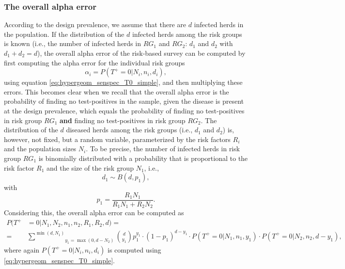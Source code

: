 \documentclass[nojss]{jss}
\begin{document}

\subsubsection{The overall alpha error}

According to the design prevalence, we assume that there are $d$ infected herds in the population. If the distribution of the $d$ infected herds among the risk groups is known (i.e., the number of infected herds in $RG_1$ and $RG_2$: $d_1$ and $d_2$ with $d_1 + d_2 = d$), the overall alpha error of the risk-based survey can be computed by first computing the alpha error for the individual risk groups
$$
\alpha_i = P(T^+=0 | N_i, n_i, d_i),
$$
using equation \eqref{eq:hypergeom_senspec_T0_simple}, and then multiplying these errors. This becomes clear when we recall that the overall alpha error is the probability of finding no test-positives in the sample, given the disease is present at the design prevalence, which equals the probability of finding no test-positives in risk group $RG_1$ \textbf{and} finding no test-positives in risk group $RG_2$. The distribution of the $d$ diseased herds among the risk groups (i.e., $d_1$ and $d_2$) is, however, not fixed, but a random variable, parameterized by the risk factors $R_i$ and the population sizes $N_i$. To be precise, the number of infected herds in risk group $RG_1$ is binomially distributed with a probability that is proportional to the risk factor $R_1$ and the size of the risk group $N_1$, i.e.,
%
$$d_1 \sim B(d,p_1),$$
%
with
%
\begin{equation}
\label{eq:riskProbability}
p_1 = \frac{R_1N_1}{R_1N_1+R_2N_2}.
\end{equation}
%
Considering this, the overall alpha error can be computed as
%
\begin{align*}
%
P(T^+&=0 | N_1, N_2, n_1, n_2, R_1, R_2, d) = \\
= & \underset{y_1 = \max(0,d-N_2)}{\overset{\min(d,N_1)}{\sum}} {d \choose y_1} p_1^{y_1} \cdot (1-p_1 )^{d-y_1} \cdot
P(T^+=0| N_1,n_1,y_1) \cdot P(T^+=0| N_2,n_2,d-y_1),
%
\end{align*}
%
where again $P(T^+=0| N_i,n_i,d_i)$ is computed using \eqref{eq:hypergeom_senspec_T0_simple}.
\end{document}
